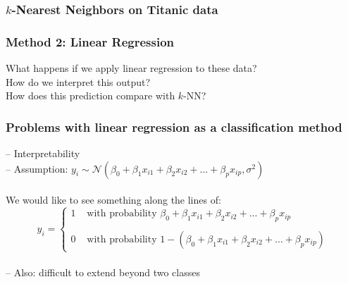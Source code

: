 \documentclass{beamer}
\begin{document}
\begin{frame}
\frametitle{$k$-Nearest Neighbors on Titanic data}
\end{frame}

\begin{frame}
\frametitle{Method 2: Linear Regression}
What happens if we apply linear regression to these data?\\
\pause\vspace{2cm}
How do we interpret this output?\\
\pause\vspace{2cm}
How does this prediction compare with $k$-NN?
\end{frame}

\begin{frame}
\frametitle{Problems with linear regression as a classification method}
-- Interpretability\\
\vspace{1cm}
-- Assumption: $y_i \sim \mathcal N(\beta_0 + \beta_1 x_{i1} + \beta_2 x_{i2} + ... + \beta_p x_{ip}, \sigma^2)$\\~\\
We would like to see something along the lines of:
$$y_i = \left\{\begin{array}{ll}
	1	& \mbox{ with probability }\beta_0 + \beta_1 x_{i1} + \beta_2 x_{i2} + ... + \beta_p x_{ip}\\\\
	0	& \mbox{ with probability }1 - (\beta_0 + \beta_1 x_{i1} + \beta_2 x_{i2} + ... + \beta_p x_{ip})
\end{array}\right.$$
\\\vspace{1cm}
-- Also: difficult to extend beyond two classes
\end{frame}
\end{document}
